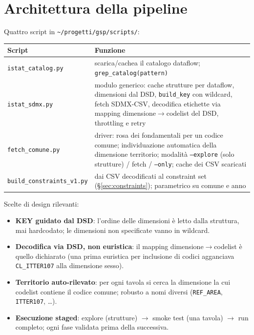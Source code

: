 \documentclass[11pt,a4paper]{article}
\newcommand{\code}[1]{\texttt{#1}}
\newcommand{\flow}[1]{\texttt{\small #1}}
\begin{document}
\section{Architettura della pipeline}
Quattro script in \code{\textasciitilde/progetti/gsp/scripts/}:

\begin{center}
\begin{tabular}{@{}lp{9.8cm}@{}}
\toprule
\textbf{Script} & \textbf{Funzione}\\
\midrule
\code{istat\_catalog.py} & scarica/cachea il catalogo dataflow; \code{grep\_catalog(pattern)}\\
\code{istat\_sdmx.py} & modulo generico: cache strutture per dataflow, dimensioni dal DSD, \code{build\_key} con wildcard, fetch SDMX-CSV, decodifica etichette via mapping dimensione$\to$codelist del DSD, throttling e retry\\
\code{fetch\_comune.py} & driver: rosa dei fondamentali per un codice comune; individuazione automatica della dimensione territorio; modalit\`a \code{--explore} (solo strutture) / fetch / \code{--only}; cache dei CSV scaricati\\
\code{build\_constraints\_v1.py} & dai CSV decodificati al constraint set (\S\ref{sec:constraints}); parametrico su comune e anno\\
\bottomrule
\end{tabular}
\end{center}

\noindent Scelte di design rilevanti:
\begin{itemize}[leftmargin=*]
  \item \textbf{KEY guidato dal DSD}: l'ordine delle dimensioni \`e letto dalla
  struttura, mai hardcodato; le dimensioni non specificate vanno in wildcard.
  \item \textbf{Decodifica via DSD, non euristica}: il mapping
  dimensione$\to$codelist \`e quello dichiarato (una prima euristica per
  inclusione di codici agganciava \flow{CL\_ITTER107} alla dimensione sesso).
  \item \textbf{Territorio auto-rilevato}: per ogni tavola si cerca la dimensione
  la cui codelist contiene il codice comune; robusto a nomi diversi
  (\code{REF\_AREA}, \code{ITTER107}, \dots).
  \item \textbf{Esecuzione staged}: explore (strutture) $\to$ smoke test (una
  tavola) $\to$ run completo; ogni fase validata prima della successiva.
\end{itemize}
\end{document}
